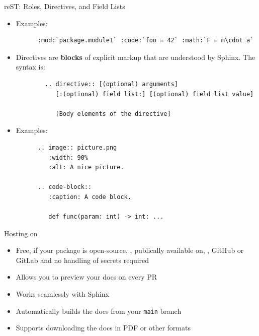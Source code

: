 {\begin{frame}[fragile]{reST: Roles, Directives, and Field Lists}
\begin{itemize}
  \item [\to] Examples:
    \begin{verbatim}
      :mod:`package.module1` :code:`foo = 42` :math:`F = m\cdot a`
    \end{verbatim}

  \item Directives are \textbf{blocks} of explicit markup that are understood by Sphinx.
    The syntax is:
    \begin{center}
      \footnotesize
      \begin{verbatim}
        .. directive:: [(optional) arguments]
           [:(optional) field list:] [(optional) field list value]

           [Body elements of the directive]
      \end{verbatim}
    \end{center}

  \item [\to] Examples:
    \footnotesize
    \begin{verbatim}
      .. image:: picture.png
         :width: 90%
         :alt: A nice picture.

      .. code-block::
         :caption: A code block.

         def func(param: int) -> int: ...
    \end{verbatim}
  \end{itemize}
\end{frame}
}

\begin{frame}[fragile]{Hosting on \rtd}
  \begin{itemize}
    \setlength{\itemsep}{1.5em}
    \item Free, if your package is open-source, \ie, publically available on, \eg, GitHub or GitLab and
      no handling of secrets required
    \item Allows you to preview your docs on every PR
    \item Works seamlessly with Sphinx
    \item Automatically builds the docs from your \texttt{main} branch
    \item Supports downloading the docs in PDF or other formats
  \end{itemize}
\end{frame}

